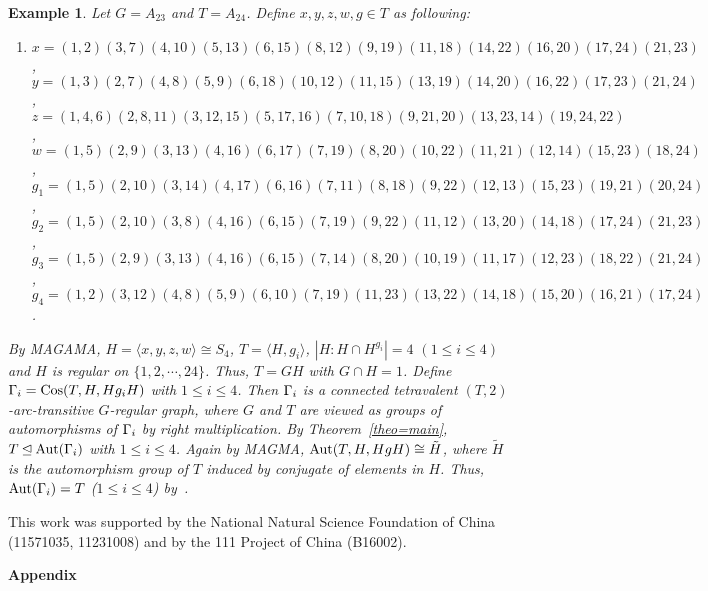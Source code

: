 \documentclass[12pt]{article}
\newtheorem{exam}[lem]{Example}%
\def\f{\noindent}
\def\Aut{\hbox{\rm Aut}}
\def\Cos{\hbox{\rm Cos}}
\begin{document}
\begin{exam}\label{NonNormalExample} Let $G=A_{23}$ and $T=A_{24}$. Define $x,y,z,w,g\in T$ as following:

\begin{enumerate}
\item[]$x=(1, 2)(3, 7)(4, 10)(5, 13)(6, 15)(8, 12)(9, 19)(11, 18)(14, 22)(16, 20)(17,
    24)(21, 23)$,\\
$y=(1, 3)(2, 7)(4, 8)(5, 9)(6, 18)(10, 12)(11, 15)(13, 19)(14, 20)(16, 22)(17,
    23)(21, 24)$,\\
$z=(1, 4, 6)(2, 8, 11)(3, 12, 15)(5, 17, 16)(7, 10, 18)(9, 21, 20)(13, 23, 14)(19,
    24, 22)$,\\
$w=(1, 5)(2, 9)(3, 13)(4, 16)(6, 17)(7, 19)(8, 20)(10, 22)(11, 21)(12, 14)(15,
    23)(18, 24)$, \\
$g_1=(1, 5)(2, 10)(3, 14)(4, 17)(6, 16)(7, 11)(8, 18)(9, 22)(12, 13)(15, 23)(19,
    21)(20, 24)$,\\
$g_2=(1, 5)(2, 10)(3, 8)(4, 16)(6, 15)(7, 19)(9, 22)(11, 12)(13, 20)(14, 18)(17,
    24)(21, 23)$, \\
$g_3=(1, 5)(2, 9)(3, 13)(4, 16)(6, 15)(7, 14)(8, 20)(10, 19)(11, 17)(12, 23)(18,
    22)(21, 24)$, \\
$g_4=(1, 2)(3, 12)(4, 8)(5, 9)(6, 10)(7, 19)(11, 23)(13, 22)(14, 18)(15, 20)(16,
    21)(17, 24)$. \\
\end{enumerate}

\rm {By MAGAMA\cite{magma}, $H=\langle x,y,z,w\rangle\cong S_4$, $T=\langle H,g_i\rangle$, $|H:H\cap H^{g_i}|=4$ $(1\leq i\leq 4)$ and $H$ is regular on $\{1,2,\cdots, 24\}$. Thus, $T=GH$ with $G\cap H=1$. Define $\G_i=\Cos(T,H,Hg_iH)$ with $1\leq i\leq 4$. Then $\Gamma_i$ is a connected tetravalent $(T,2)$-arc-transitive $G$-regular graph, where $G$ and $T$ are viewed as groups of automorphisms of $\Gamma_i$ by right multiplication. By Theorem~\ref{theo=main}, $T\unlhd \Aut(\G_i)$ with $1\leq i\leq 4$. Again by MAGMA, $\Aut(T,H,HgH)\cong \tilde{H}$, where $\tilde{H}$ is the automorphism group of $T$ induced by conjugate of elements in $H$. Thus, $\Aut(\G_i)=T$ ($1\leq i\leq 4$) by~\cite[Lemma~2.10]{WFZ}.}
\end{exam}


\medskip
\f {\bf Acknowledgement:} This work was supported by the National Natural Science Foundation of China (11571035, 11231008) and by the 111 Project of China (B16002).


\newpage
\begin{center}{\bf \Large Appendix}\end{center}
\end{document}
